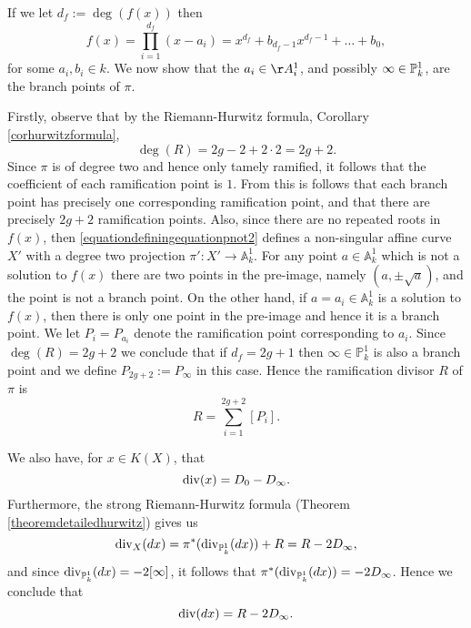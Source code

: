If we let $d_f:=\deg(f(x))$ then 
    \begin{equation}\label{equationexpansionoff(x)}
    f(x) = \prod_{i=1}^{d_f} (x-a_i) = x^{d_f} + b_{d_f - 1}x^{d_f-1} + \ldots + b_0,
    \end{equation}
for some $a_i, b_i \in k$.
We now show that the $a_i \in \AA_i^1$, and possibly $\infty \in {\mathbb P}_k^1$, are the branch points of $\pi$.

Firstly, observe that by the Riemann-Hurwitz formula, Corollary \ref{corhurwitzformula},
    \[ 
    \deg(R) = 2g -2 +2\cdot 2 = 2g + 2.
    \]
Since $\pi$ is of degree two and hence only tamely ramified, it follows that the coefficient of each ramification point is $1$.
From this is follows that each branch point has precisely one corresponding ramification point, and that there are precisely $2g+2$ ramification points.
Also, since there are no repeated roots in $f(x)$, then \eqref{equationdefiningequationpnot2} defines a non-singular affine curve $X'$ with a degree two projection $\pi'\colon X'\rightarrow \mathbb A_k^1$.
For any point $a\in \mathbb A_k^1$ which is not a solution to $f(x)$ there are two points in the pre-image, namely $(a,\pm \sqrt{a})$, and the point is not a branch point.
On the other hand, if $a = a_i \in \mathbb A_k^1$ is a solution to $f(x)$, then there is only one point in the pre-image and hence it is a branch point.
We let $P_i = P_{a_i}$ denote the ramification point corresponding to $a_i$.
Since $\deg(R) = 2g+2$ we conclude that if $d_f = 2g+1$ then $\infty \in \mathbb P_k^1$ is also a branch point and we define $P_{2g+2} := P_\infty$ in this case.
Hence the ramification divisor $R$ of $\pi$ is
    \[
    R = \sum_{i=1}^{2g+2} [P_i] .
    \]

We also have, for $x \in K(X)$, that
    \begin{equation}\label{equationdivxpis2}
    \operatorname{div} (x)  = D_0 - D_\infty.
    \end{equation}
Furthermore, the strong Riemann-Hurwitz formula (Theorem \ref{theoremdetailedhurwitz}) gives us
    \[
    \operatorname{div}_X (dx) = \pi^*( \operatorname{div}_{\mathbb P^1_k}(dx)) + R = R - 2D_{\infty},
    \]
and since $\operatorname{div}_{{\mathbb P}_k^1}(dx) = -2[\infty]$, it follows that $\pi^*(\operatorname{div}_{{\mathbb P}_k^1}(dx)) = -2D_\infty$.
Hence we conclude that
    \begin{equation}\label{equationdifferentialdivisor}
    \operatorname{div}(dx) = R - 2D_\infty.
    \end{equation}

